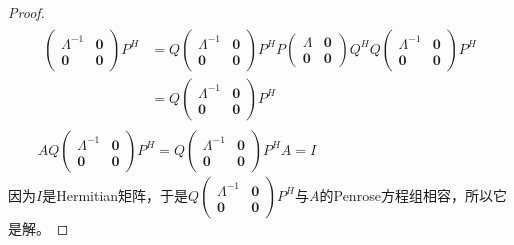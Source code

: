 \begin{proof}
\begin{gather*}
\begin{aligned}
\begin{pmatrix}
				\varLambda^{-1} & \mathbf{0} \\
				\mathbf{0} & \mathbf{0}
			\end{pmatrix}
			P^H
			&=Q
			\begin{pmatrix}
				\varLambda^{-1} & \mathbf{0} \\
				\mathbf{0} & \mathbf{0}
			\end{pmatrix}
			P^HP
			\begin{pmatrix}
				\varLambda & \mathbf{0} \\
				\mathbf{0} & \mathbf{0}
			\end{pmatrix}
			Q^HQ
			\begin{pmatrix}
				\varLambda^{-1} & \mathbf{0} \\
				\mathbf{0} & \mathbf{0}
			\end{pmatrix}
			P^H \\
			&=Q
			\begin{pmatrix}
				\varLambda^{-1} & \mathbf{0} \\
				\mathbf{0} & \mathbf{0}
			\end{pmatrix}
			P^H
		\end{aligned} \\
		AQ
		\begin{pmatrix}
			\varLambda^{-1} & \mathbf{0} \\
			\mathbf{0} & \mathbf{0}
		\end{pmatrix}
		P^H=Q
		\begin{pmatrix}
			\varLambda^{-1} & \mathbf{0} \\
			\mathbf{0} & \mathbf{0}
		\end{pmatrix}
		P^HA=I
	\end{gather*}
	因为$I$是Hermitian矩阵，于是$Q
	\begin{pmatrix}
		\varLambda^{-1} & \mathbf{0} \\
		\mathbf{0} & \mathbf{0}
	\end{pmatrix}
	P^H$与$A$的Penrose方程组相容，所以它是解。
\end{proof}
